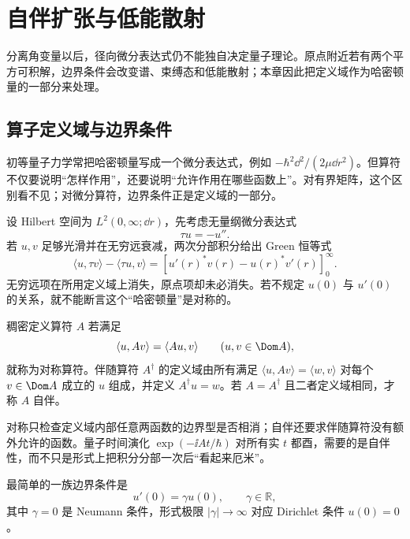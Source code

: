 \section{自伴扩张与低能散射}
\label{chap:singular-radial-hamiltonian}

分离角变量以后，径向微分表达式仍不能独自决定量子理论。原点附近若有两个平方可积解，边界条件会改变谱、束缚态和低能散射；本章因此把定义域作为哈密顿量的一部分来处理。

\subsection{算子定义域与边界条件}

初等量子力学常把哈密顿量写成一个微分表达式，例如
\(-\hbar^2\dd^2/(2\mu\dd r^2)\)。但算符不仅要说明“怎样作用”，还要说明“允许作用在哪些函数上”。对有界矩阵，这个区别看不见；对微分算符，边界条件正是定义域的一部分。

设 Hilbert 空间为 \(L^2(0,\infty;\dd r)\)，先考虑无量纲微分表达式
\[
\tau u=-u''.
\]
若 \(u,v\) 足够光滑并在无穷远衰减，两次分部积分给出 Green 恒等式
\begin{equation}
\langle u,\tau v\rangle-\langle\tau u,v\rangle
=\left[u'(r)^*v(r)-u(r)^*v'(r)\right]_{0}^{\infty}.
\label{eq:radial-green-boundary-form}
\end{equation}
无穷远项在所用定义域上消失，原点项却未必消失。若不规定
\(u(0)\) 与 \(u'(0)\) 的关系，就不能断言这个“哈密顿量”是对称的。

\begin{definition}[对称算符与自伴算符]
稠密定义算符 \(A\) 若满足
\[
\langle u,Av\rangle=\langle Au,v\rangle
\qquad (u,v\in\Dom A),
\]
就称为对称算符。伴随算符 \(A^\dagger\) 的定义域由所有满足
\(
\langle u,Av\rangle=\langle w,v\rangle
\)
对每个 \(v\in\Dom A\) 成立的 \(u\) 组成，并定义
\(A^\dagger u=w\)。若
\(A=A^\dagger\) 且二者定义域相同，才称 \(A\) 自伴。
\end{definition}

对称只检查定义域内部任意两函数的边界型是否相消；自伴还要求伴随算符没有额外允许的函数。量子时间演化
\(\exp(-\ii At/\hbar)\) 对所有实 \(t\) 都酉，需要的是自伴性，而不只是形式上把积分分部一次后“看起来厄米”。

最简单的一族边界条件是
\begin{equation}
u'(0)=\gamma u(0),
\qquad \gamma\in\mathbb R,
\label{eq:radial-robin-boundary}
\end{equation}
其中 \(\gamma=0\) 是 Neumann 条件，形式极限
\(|\gamma|\to\infty\) 对应 Dirichlet 条件 \(u(0)=0\)。


